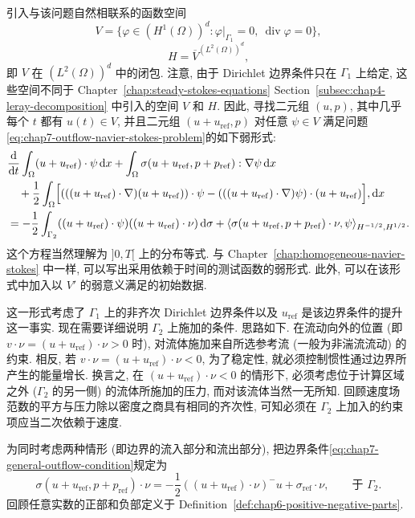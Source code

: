 \begin{sloppypar}
引入与该问题自然相联系的函数空间
\[
 V=\{\varphi\in(H^1(\Omega))^d:\varphi|_{\Gamma_1}=0,
 \ \operatorname{div}\varphi=0\},
\]
\[
 H=\overline V^{(L^2(\Omega))^d},
\]
即 $V$ 在 $(L^2(\Omega))^d$ 中的闭包. 注意, 由于 Dirichlet 边界条件只在 $\Gamma_1$ 上给定, 这些空间不同于 Chapter~\ref{chap:steady-stokes-equations} Section~\ref{subsec:chap4-leray-decomposition} 中引入的空间 $V$ 和 $H$. 因此, 寻找二元组 $(u,p)$, 其中几乎每个 $t$ 都有 $u(t)\in V$, 并且二元组 $(u+u_{\mathrm{ref}},p)$ 对任意 $\psi\in V$ 满足问题\eqref{eq:chap7-outflow-navier-stokes-problem}的如下弱形式:
\[
\begin{aligned}
 &\frac{\mathrm d}{\mathrm dt}\int_\Omega(u+u_{\mathrm{ref}})\cdot\psi\,\mathrm dx
 +\int_\Omega\sigma(u+u_{\mathrm{ref}},p+p_{\mathrm{ref}}):\nabla\psi\,\mathrm dx\\
 &\quad+\frac12\int_\Omega\Bigl[
 (((u+u_{\mathrm{ref}})\cdot\nabla)(u+u_{\mathrm{ref}}))\cdot\psi
 -(((u+u_{\mathrm{ref}})\cdot\nabla)\psi)\cdot(u+u_{\mathrm{ref}})
 \Bigr],\mathrm dx\\
 &=-\frac12\int_{\Gamma_2}((u+u_{\mathrm{ref}})\cdot\psi)
 ((u+u_{\mathrm{ref}})\cdot\nu)\,\mathrm d\sigma
 +\langle\sigma(u+u_{\mathrm{ref}},p+p_{\mathrm{ref}})\cdot\nu,
 \psi\rangle_{H^{-1/2},H^{1/2}}.
\end{aligned}
\]
这个方程当然理解为 $]0,T[$ 上的分布等式. 与 Chapter~\ref{chap:homogeneous-navier-stokes} 中一样, 可以写出采用依赖于时间的测试函数的弱形式. 此外, 可以在该形式中加入以 $V'$ 的弱意义满足的初始数据.

这一形式考虑了 $\Gamma_1$ 上的非齐次 Dirichlet 边界条件以及 $u_{\mathrm{ref}}$ 是该边界条件的提升这一事实. 现在需要详细说明 $\Gamma_2$ 上施加的条件. 思路如下. 在流动向外的位置 (即 $v\cdot\nu=(u+u_{\mathrm{ref}})\cdot\nu>0$ 时), 对流体施加来自所选参考流 (一般为非湍流流动) 的约束. 相反, 若 $v\cdot\nu=(u+u_{\mathrm{ref}})\cdot\nu<0$, 为了稳定性, 就必须控制惯性通过边界所产生的能量增长. 换言之, 在 $(u+u_{\mathrm{ref}})\cdot\nu<0$ 的情形下, 必须考虑位于计算区域之外 ($\Gamma_2$ 的另一侧) 的流体所施加的压力, 而对该流体当然一无所知. 回顾速度场范数的平方与压力除以密度之商具有相同的齐次性, 可知必须在 $\Gamma_2$ 上加入的约束项应当二次依赖于速度.

为同时考虑两种情形 (即边界的流入部分和流出部分), 把边界条件\eqref{eq:chap7-general-outflow-condition}规定为
\begin{equation}
 \sigma(u+u_{\mathrm{ref}},p+p_{\mathrm{ref}})\cdot\nu
 =-\frac12((u+u_{\mathrm{ref}})\cdot\nu)^-u
 +\sigma_{\mathrm{ref}}\cdot\nu,
 \qquad\text{于 }\Gamma_2.
\label{eq:chap7-nonlinear-outflow-condition}
\end{equation}
回顾任意实数的正部和负部定义于 Definition~\ref{def:chap6-positive-negative-parts}.


\end{sloppypar}
